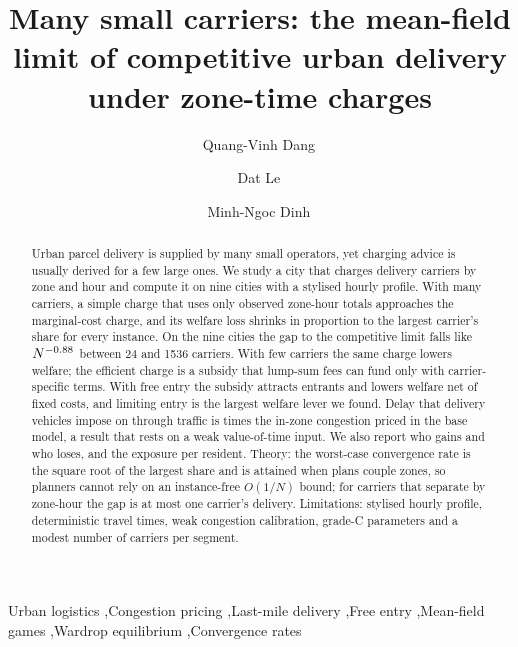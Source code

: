 \documentclass[preprint,11pt,authoryear]{elsarticle}
\theoremstyle{plain}
\theoremstyle{remark}
\begin{document}
\begin{frontmatter}
\title{Many small carriers: the mean-field limit of competitive urban delivery under zone-time charges}

\author[a]{Quang-Vinh Dang\,}
\author[b]{Dat Le\,}
\author[c]{Minh-Ngoc Dinh\,}
\address[a]{British University Vietnam, Hung Yen, Vietnam}
\address[b]{Department of Science, Technology, and International Projects, Ho Chi Minh City University of Economics and Finance, Ho Chi Minh City, 700000, Vietnam}
\address[c]{Millennia Education, Ho Chi Minh City, Vietnam}

\begin{abstract}
Urban parcel delivery is supplied by many small operators, yet charging advice is usually derived for a few large ones. We study a city that charges delivery carriers by zone and hour and compute it on nine cities with a stylised hourly profile. With many carriers, a simple charge that uses only observed zone-hour totals approaches the marginal-cost charge, and its welfare loss shrinks in proportion to the largest carrier's share for every instance. On the nine cities the gap to the competitive limit falls like $N^{-0.88}$ between 24 and 1536 carriers. With few carriers the same charge lowers welfare; the efficient charge is a subsidy that lump-sum fees can fund only with carrier-specific terms. With free entry the subsidy attracts entrants and lowers welfare net of fixed costs, and limiting entry is the largest welfare lever we found. Delay that delivery vehicles impose on through traffic is \ExtRatioKQ{} times the in-zone congestion priced in the base model, a result that rests on a weak value-of-time input. We also report who gains and who loses, and the exposure per resident. Theory: the worst-case convergence rate is the square root of the largest share and is attained when plans couple zones, so planners cannot rely on an instance-free $O(1/N)$ bound; for carriers that separate by zone-hour the gap is at most one carrier's delivery. Limitations: stylised hourly profile, deterministic travel times, weak congestion calibration, grade-C parameters and a modest number of carriers per segment.
\end{abstract}

\begin{keyword}
Urban logistics \sep Congestion pricing \sep Last-mile delivery \sep Free entry \sep Mean-field games \sep Wardrop equilibrium \sep Convergence rates
\end{keyword}
\end{frontmatter}
\end{document}
